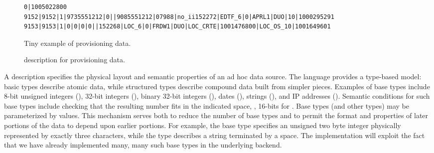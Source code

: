 \documentclass[11pt]{article}
\begin{document}
\begin{figure*}
\begin{small}
\begin{verbatim}
0|1005022800
9152|9152|1|9735551212|0||9085551212|07988|no_ii152272|EDTF_6|0|APRL1|DUO|10|1000295291
9153|9153|1|0|0|0|0||152268|LOC_6|0|FRDW1|DUO|LOC_CRTE|1001476800|LOC_OS_10|1001649601
\end{verbatim}
\caption{Tiny example of \dibbler{} provisioning data.}
\label{figure:dibbler-records}
\end{small}
\end{figure*}

\suppressfloats


\begin{figure}
\begin {code}

\end{code}
\caption{\datatype{} description for \dibbler{} provisioning data.}
\label{figure:dibblerml}
\end{figure}


A \datatype{} description specifies the physical layout and 
semantic properties of an ad hoc data source. 
The language provides a type-based model:
basic types describe atomic data, while
structured types describe compound data built from simpler pieces.
Examples of base
types include 8-bit unsigned integers (), 32-bit
integers (), binary 32-bit integers (),
dates (), strings (),
and IP addresses ().  Semantic conditions for such base types
include checking that the resulting number fits in the indicated
space, \ie, 16-bits for .  
%
%
Base types (and other types) may be parameterized by values.  
This mechanism serves
both to reduce the number of base types and to permit the format and
properties of later portions of the data to depend upon earlier
portions.  For example, the base type  specifies
an unsigned two byte integer physically represented by exactly three
characters, while the type  describes a string
terminated by a space.
The \datatype{} implementation 
will exploit the fact that we have already implemented many,
many such base types in the underlying \pads{} backend.  
\end{document}
